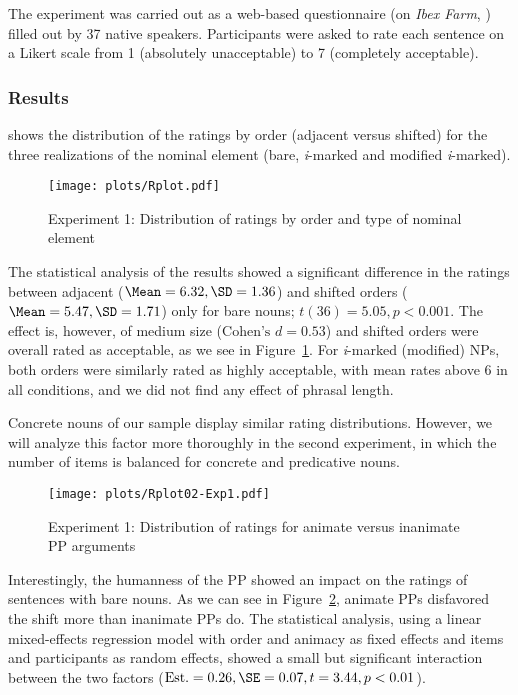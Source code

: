 \documentclass[output=paper]{langsci/langscibook}
\begin{document}
The experiment was carried out as a web-based questionnaire (on \textit{Ibex Farm}, \cite{ibex}) filled out by 37 native speakers. Participants were asked to rate each sentence on a Likert scale from 1 (absolutely unacceptable) to 7 (completely acceptable).

\subsubsection{Results}
 shows the distribution of the ratings by order (adjacent versus shifted) for the three realizations of the nominal element (bare, \textit{i}-marked and modified \textit{i}-marked). 

\begin{figure}
    \texttt{[image: plots/Rplot.pdf]}
	\caption{Experiment 1: Distribution of ratings by order and type of nominal element}\label{boxplot}
\end{figure}

The statistical analysis of the results showed a significant difference in the ratings between adjacent ($\Mean=6.32, \SD=1.36$) and shifted orders ($\Mean=5.47, \SD=1.71$) only for bare nouns; $t(36)=5.05, p<0.001$.
The effect is, however, of medium size ($\text{Cohen's } d=0.53$) and shifted orders were overall rated as acceptable, as we see in Figure~\ref{boxplot}. 
For \textit{i}-marked (modified) NPs, both orders were similarly rated as highly acceptable, with mean rates above 6 %
in all conditions, and we did not find any effect of phrasal length.

Concrete nouns of our sample display similar rating distributions. However, we will analyze this factor more thoroughly in the second experiment, in which the number of items is balanced for concrete and predicative nouns.

\begin{figure}
    \texttt{[image: plots/Rplot02-Exp1.pdf]}
	\caption{Experiment 1: Distribution of ratings for animate versus inanimate PP arguments}\label{boxplot12}
\end{figure}

Interestingly, the humanness of the PP showed an impact on the ratings of sentences with bare nouns. As we can see in Figure~\ref{boxplot12}, animate PPs disfavored the shift more than inanimate PPs do. The statistical analysis, using a linear mixed-effects regression model with order and animacy as fixed effects and items and participants as random effects, showed a small but significant interaction between the two factors ($\text{Est.}= 0.26, \SE=0.07, t=3.44, p<0.01$). 
\end{document}
